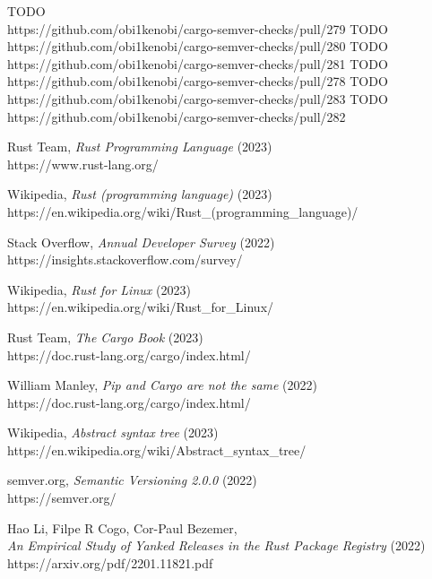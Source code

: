 \documentclass[licencjacka,en]{pracamgr}
\begin{document}
\begin{thebibliography}{99}
 TODO \\ https://github.com/obi1kenobi/cargo-semver-checks/pull/279
 TODO \\ https://github.com/obi1kenobi/cargo-semver-checks/pull/280
 TODO \\ https://github.com/obi1kenobi/cargo-semver-checks/pull/281
 TODO \\ https://github.com/obi1kenobi/cargo-semver-checks/pull/278
 TODO \\ https://github.com/obi1kenobi/cargo-semver-checks/pull/283
 TODO \\ https://github.com/obi1kenobi/cargo-semver-checks/pull/282

 Rust Team,
	\textit{Rust Programming Language} (2023) \\
	https://www.rust-lang.org/

 Wikipedia,
	\textit{Rust (programming language)} (2023) \\
	https://en.wikipedia.org/wiki/Rust\_(programming\_language)/

 Stack Overflow,
	\textit{Annual Developer Survey} (2022) \\
	https://insights.stackoverflow.com/survey/

 Wikipedia,
	\textit{Rust for Linux} (2023) \\
	https://en.wikipedia.org/wiki/Rust\_for\_Linux/

 Rust Team,
	\textit{The Cargo Book} (2023) \\
	https://doc.rust-lang.org/cargo/index.html/

 William Manley,
	\textit{Pip and Cargo are not the same} (2022) \\
	https://doc.rust-lang.org/cargo/index.html/

 Wikipedia,
	\textit{Abstract syntax tree} (2023) \\
	https://en.wikipedia.org/wiki/Abstract\_syntax\_tree/

 semver.org,
	\textit{Semantic Versioning 2.0.0} (2022) \\
	https://semver.org/

 Hao Li, Filpe R Cogo, Cor-Paul Bezemer, \\
    \textit{An Empirical Study of Yanked Releases in the Rust Package Registry}
    (2022) \\ https://arxiv.org/pdf/2201.11821.pdf


\end{thebibliography}
\end{document}
